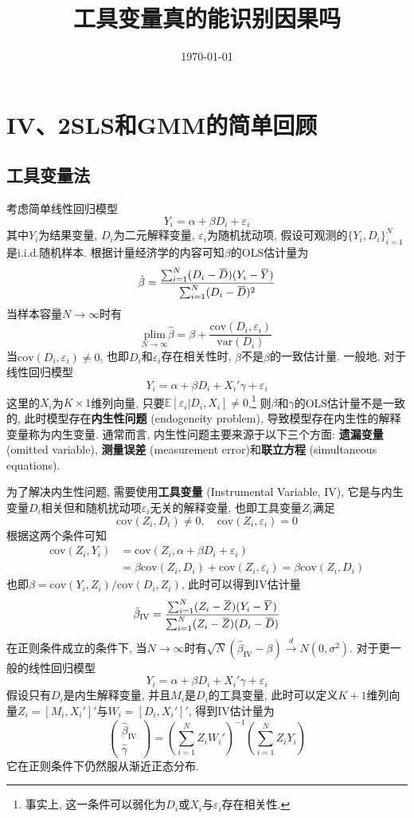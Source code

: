 \documentclass[cn,blue,14pt,screen,bibstyle=gb7714-2015]{elegantnote}
\title{工具变量真的能识别因果吗}
\date{\today}
\newcommand{\E}{\mathbb{E}}
\newcommand{\overbar}[1]{\mkern 1.5mu\overline{\mkern-1.5mu#1\mkern-1.5mu}\mkern 1.5mu}
\begin{document}
\maketitle

\newpage
\section{IV、2SLS和GMM的简单回顾}
\subsection{工具变量法}
考虑简单线性回归模型
$$Y_i=\alpha+\beta D_i+\varepsilon_i$$
其中$Y_i$为结果变量, $D_i$为二元解释变量, $\varepsilon_i$为随机扰动项, 假设可观测的$\{Y_i,D_i\}_{i=1}^N$是i.i.d.随机样本. 根据计量经济学的内容可知$\beta$的OLS估计量为
$$\hat{\beta}=\frac{\sum_{i=1}^{N}(D_i-\overbar{D})(Y_i-\overbar{Y})}{\sum_{i=1}^{N}(D_i-\overbar{D})^2}$$
当样本容量$N\to\infty$时有
$$\underset{N\to\infty}{\text{plim}}\hat{\beta}=\beta+\frac{\text{cov}(D_i,\varepsilon_i)}{\text{var}(D_i)}$$
当$\text{cov}(D_i,\varepsilon_i)\ne0$, 也即$D_i$和$\varepsilon_i$存在相关性时, $\hat{\beta}$不是$\beta$的一致估计量. 一般地, 对于线性回归模型
$$Y_i=\alpha+\beta D_i+X_i'\gamma+\varepsilon_i$$
这里的$X_i$为$K\times 1$维列向量, 只要$\E[\varepsilon_i|D_i,X_i]\ne0$,\footnote{事实上, 这一条件可以弱化为$D_i$或$X_i$与$\varepsilon_i$存在相关性.} 则$\beta$和$\gamma$的OLS估计量不是一致的, 此时模型存在\textbf{内生性问题} (endogeneity problem), 导致模型存在内生性的解释变量称为内生变量. 通常而言, 内生性问题主要来源于以下三个方面: \textbf{遗漏变量} (omitted variable), \textbf{测量误差} (measurement error)和\textbf{联立方程} (simultaneous equations).

为了解决内生性问题, 需要使用\textbf{工具变量} (Instrumental Variable, IV), 它是与内生变量$D_i$相关但和随机扰动项$\varepsilon_i$无关的解释变量, 也即工具变量$Z_i$满足
$$\text{cov}(Z_i,D_i)\neq0,\quad \text{cov}(Z_i,\varepsilon_i)=0$$
根据这两个条件可知
\begin{align*}
\text{cov}(Z_i,Y_i)&=\text{cov}(Z_i,\alpha+\beta D_i+\varepsilon_i) \\
&=\beta\text{cov}(Z_i,D_i)+\text{cov}(Z_i,\varepsilon_i)=\beta\text{cov}(Z_i,D_i)
\end{align*}
也即$\beta=\text{cov}(Y_i,Z_i)/\text{cov}(D_i,Z_i)$, 此时可以得到IV估计量
$$\hat{\beta}_\text{IV}=\frac{\sum_{i=1}^{N}(Z_i-\overbar{Z})(Y_i-\overbar{Y})}{\sum_{i=1}^{N}(Z_i-\overbar{Z})(D_i-\overbar{D})}$$
在正则条件成立的条件下, 当$N\to\infty$时有$\sqrt{N}(\hat{\beta}_\text{IV}-\beta)\xrightarrow{d} N(0,\sigma^2)$. 对于更一般的线性回归模型
$$Y_i=\alpha+\beta D_i+X_i'\gamma+\varepsilon_i$$
假设只有$D_i$是内生解释变量, 并且$M_i$是$D_i$的工具变量, 此时可以定义$K+1$维列向量$Z_i=[M_i,X_i']'$与$W_i=[D_i,X_i']'$, 得到IV估计量为
$$\begin{pmatrix}
    \hat{\beta}_\text{IV} \\
    \hat{\gamma}
  \end{pmatrix}=\left(\sum_{i=1}^{N}Z_iW_i'\right)^{-1}\left(\sum_{i=1}^{N}Z_iY_i\right)$$
它在正则条件下仍然服从渐近正态分布. 
\end{document}
